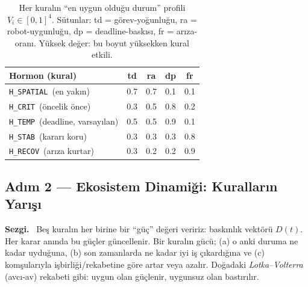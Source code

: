 \documentclass[11pt,a4paper]{article}
\newenvironment{sezgi}
  {\begin{lrbox}{\sezgibox}%
   \begin{minipage}{\dimexpr\linewidth-2\fboxsep-2\fboxrule\relax}%
   \small\textbf{\color{blue!55!black}Sezgi.}~}
  {\end{minipage}\end{lrbox}%
   \par\smallskip\noindent
   \fcolorbox{blue!45!black}{blue!5}{\usebox{\sezgibox}}%
   \par\smallskip}
\newcommand{\Hspatial}{\texttt{H\_SPATIAL}}
\newcommand{\Hcrit}{\texttt{H\_CRIT}}
\newcommand{\Htemp}{\texttt{H\_TEMP}}
\newcommand{\Hstab}{\texttt{H\_STAB}}
\newcommand{\Hrecov}{\texttt{H\_RECOV}}
\begin{document}
\begin{table}[t]
\centering
\caption{Her kuralın ``en uygun olduğu durum'' profili $V_i\in[0,1]^4$.
Sütunlar: td = görev-yoğunluğu, ra = robot-uygunluğu, dp = deadline-baskısı,
fr = arıza-oranı. Yüksek değer: bu boyut yüksekken kural etkili.}
\label{tab:proto}
\small
\begin{tabular}{@{}lcccc@{}}
\toprule
\textbf{Hormon (kural)} & td & ra & dp & fr \\
\midrule
\Hspatial\ (en yakın)        & 0.7 & 0.7 & 0.1 & 0.1 \\
\Hcrit\ (öncelik önce)       & 0.3 & 0.5 & 0.8 & 0.2 \\
\Htemp\ (deadline, varsayılan)& 0.5 & 0.5 & 0.9 & 0.1 \\
\Hstab\ (kararı koru)        & 0.3 & 0.3 & 0.3 & 0.8 \\
\Hrecov\ (arıza kurtar)      & 0.3 & 0.2 & 0.2 & 0.9 \\
\bottomrule
\end{tabular}
\end{table}

\subsection{Adım 2 --- Ekosistem Dinamiği: Kuralların Yarışı}
\label{sec:dynamics}

\begin{sezgi}
Beş kuralın her birine bir ``güç'' değeri veririz: baskınlık vektörü $D(t)$.
Her karar anında bu güçler güncellenir. Bir kuralın gücü; (a) o anki duruma ne
kadar uyduğuna, (b) son zamanlarda ne kadar iyi iş çıkardığına ve (c)
komşularıyla işbirliği/rekabetine göre artar veya azalır. Doğadaki
\emph{Lotka--Volterra} (avcı-av) rekabeti gibi: uygun olan güçlenir, uygunsuz
olan bastırılır.
\end{sezgi}
\end{document}
